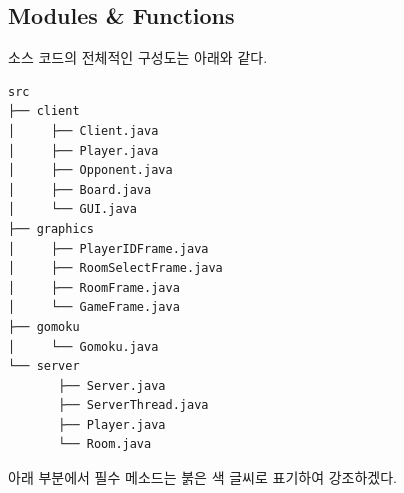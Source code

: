 \documentclass[a4paper, 10pt]{article}
\begin{document}
\subsection{Modules \& Functions}
소스 코드의 전체적인 구성도는 아래와 같다.
\begin{Verbatim}[tabsize=4,xleftmargin=2em,baselinestretch=1]
src
├── client
│     ├── Client.java
│     ├── Player.java
│     ├── Opponent.java
│     ├── Board.java
│     └── GUI.java
├── graphics
│     ├── PlayerIDFrame.java
│     ├── RoomSelectFrame.java
│     ├── RoomFrame.java
│     └── GameFrame.java
├── gomoku
│     └── Gomoku.java
└── server
       ├── Server.java
       ├── ServerThread.java
       ├── Player.java
       └── Room.java
\end{Verbatim}
아래 부분에서 필수 메소드는 {\color{red} 붉은 색 글씨}로 표기하여 강조하겠다.
\end{document}

